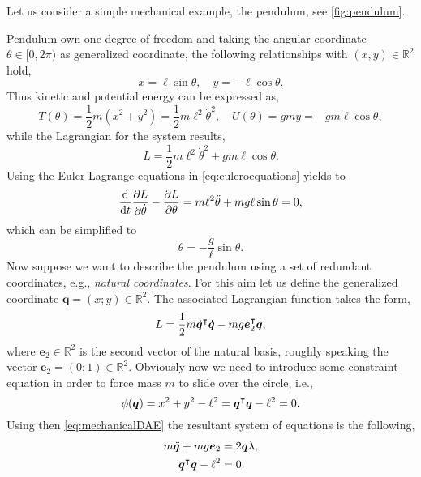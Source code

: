 		\begin{example}
			\label{ex:pendulum1}
			Let us consider a simple mechanical example,
			the pendulum, see \cref{fig:pendulum}.
			
			Pendulum own one-degree of freedom and taking the angular
			coordinate $\theta\in[0,2\pi)$ as generalized coordinate,
			the following relationships with $(x,y)\in\mathbb{R}^{2}$ hold, 
			\begin{equation*}
			  x = \ell\sin{\theta}, \quad y = -\ell\cos{\theta}.
			\end{equation*}
			Thus kinetic and potential energy can be expressed as, 
			\begin{equation*}
				T(\theta) = \frac{1}{2}m(\dot{x}^{2}+\dot{y}^{2})
				= \frac{1}{2}m\ell^{2}\dot{\theta}^{2},\quad U(\theta)
				= gmy = -gm\ell\cos{\theta}, 
			\end{equation*}
			while the Lagrangian for the system results, 
			\begin{equation*}
				L = \frac{1}{2}m\ell^{2}\dot{\theta}^{2} + gm\ell\cos{\theta}.
			\end{equation*}
			Using the Euler-Lagrange equations in \cref{eq:euleroequations} yields to
			\begin{equation*}
				\frac{\mathop{}\!\mathrm{d}}{\mathop{}\!\mathrm{d} t}\frac{\partial L}{\partial\dot{\theta}}
				-\frac{\partial L}{\partial\theta} = m\ell^{2}\ddot{\theta} + mg\ell\sin{\theta} = 0,
			\end{equation*}
			which can be simplified to
			\begin{equation*}
				\ddot{\theta} = -\frac{g}{\ell}\sin{\theta}.
			\end{equation*}
			Now suppose we want to describe the pendulum using
			a set of redundant coordinates, e.g., \emph{natural coordinates}.
			For this aim let us define the generalized coordinate $\bm{q} = (x;y)\in\mathbb{R}^{2}$.
			The associated Lagrangian function takes the form, 
			\begin{equation*}
				L = \frac{1}{2}m\dot{\bm{q}}^{\intercal}\bm{\dot{q}} - mg\bm{e}^{\intercal}_{2}\bm{q},
			\end{equation*}
			where $\bm{e}_{2}\in\mathbb{R}^{2}$ is the second vector of 
			the natural basis, roughly speaking the vector
			$\bm{e}_{2} = (0;1)\in\mathbb{R}^{2}$.
			Obviously now we need to introduce some constraint equation
			in order to force mass $m$ to slide over the circle, i.e., 
			\begin{equation*}
				\phi(\bm{q}) = x^{2}+y^{2} - \ell^{2} = \bm{q}^{\intercal}\bm{q}-\ell^{2} = 0.
			\end{equation*}
			Using then \cref{eq:mechanicalDAE} the resultant system of equations is the following,
			\begin{subequations}
				\begin{align*}
					m\ddot{\bm{q}} + mg\bm{e}_{2} &= 2\bm{q}\lambda, \\
					\bm{q}^{\intercal}\bm{q}-\ell^{2} &= 0.
				\end{align*}
			\end{subequations}
		\end{example}
		